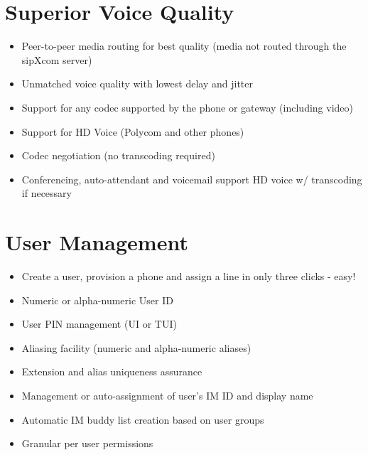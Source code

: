 \documentclass[letterpaper,10pt,english]{sphinxmanual}
\begin{document}
\section{Superior Voice Quality}
\label{\detokenize{features:superior-voice-quality}}\begin{itemize}
\item {} 
Peer-to-peer media routing for best quality (media not routed through the sipXcom server)

\item {} 
Unmatched voice quality with lowest delay and jitter

\item {} 
Support for any codec supported by the phone or gateway (including video)

\item {} 
Support for HD Voice (Polycom and other phones)

\item {} 
Codec negotiation (no transcoding required)

\item {} 
Conferencing, auto-attendant and voicemail support HD voice w/ transcoding if necessary

\end{itemize}


\section{User Management}
\label{\detokenize{features:user-management}}\begin{itemize}
\item {} 
Create a user, provision a phone and assign a line in only three clicks - easy!

\item {} 
Numeric or alpha-numeric User ID

\item {} 
User PIN management (UI or TUI)

\item {} 
Aliasing facility (numeric and alpha-numeric aliases)

\item {} 
Extension and alias uniqueness assurance

\item {} 
Management or auto-assignment of user’s IM ID and display name

\item {} 
Automatic IM buddy list creation based on user groups

\item {} 
Granular per user permissions

\end{itemize}
\end{document}

